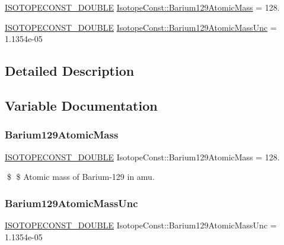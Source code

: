 \begin{DoxyCompactItemize}
\item 
\mbox{\hyperlink{group___isotope_const-_macros_ga8f45a7272ce02c0b4c65c44636ed719a}{I\+S\+O\+T\+O\+P\+E\+C\+O\+N\+S\+T\+\_\+\+D\+O\+U\+B\+LE}} \mbox{\hyperlink{group___isotope_const-_barium-_ba129_ga67246ebb594ed11f4be989a074acfe37}{Isotope\+Const\+::\+Barium129\+Atomic\+Mass}} = 128.
\item 
\mbox{\hyperlink{group___isotope_const-_macros_ga8f45a7272ce02c0b4c65c44636ed719a}{I\+S\+O\+T\+O\+P\+E\+C\+O\+N\+S\+T\+\_\+\+D\+O\+U\+B\+LE}} \mbox{\hyperlink{group___isotope_const-_barium-_ba129_ga326e852e3be4b43394a4ed0a46bde16c}{Isotope\+Const\+::\+Barium129\+Atomic\+Mass\+Unc}} = 1.\+1354e-\/05
\end{DoxyCompactItemize}


\subsection{Detailed Description}


\subsection{Variable Documentation}
\mbox{\label{group___isotope_const-_barium-_ba129_ga67246ebb594ed11f4be989a074acfe37}} 
\subsubsection{\texorpdfstring{Barium129\+Atomic\+Mass}{Barium129AtomicMass}}
{\footnotesize\ttfamily \mbox{\hyperlink{group___isotope_const-_macros_ga8f45a7272ce02c0b4c65c44636ed719a}{I\+S\+O\+T\+O\+P\+E\+C\+O\+N\+S\+T\+\_\+\+D\+O\+U\+B\+LE}} Isotope\+Const\+::\+Barium129\+Atomic\+Mass = 128.}

\$ \$ Atomic mass of Barium-\/129 in amu. \mbox{\label{group___isotope_const-_barium-_ba129_ga326e852e3be4b43394a4ed0a46bde16c}} 
\subsubsection{\texorpdfstring{Barium129\+Atomic\+Mass\+Unc}{Barium129AtomicMassUnc}}
{\footnotesize\ttfamily \mbox{\hyperlink{group___isotope_const-_macros_ga8f45a7272ce02c0b4c65c44636ed719a}{I\+S\+O\+T\+O\+P\+E\+C\+O\+N\+S\+T\+\_\+\+D\+O\+U\+B\+LE}} Isotope\+Const\+::\+Barium129\+Atomic\+Mass\+Unc = 1.\+1354e-\/05}

